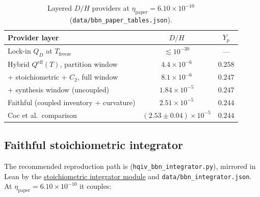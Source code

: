 \documentclass[11pt]{amsart}
\newcommand{\etap}{\ensuremath{\eta_{\mathrm{paper}}}}
\begin{document}
\begin{table}[ht]
\centering
\caption{Layered $D/H$ providers at $\etap=6.10\times10^{-10}$
(\texttt{data/bbn\_paper\_tables.json}).}
\label{tab:provider-decomposition}
\begin{tabular}{lcc}
\toprule
Provider layer & $D/H$ & $Y_p$ \\
\midrule
Lock-in $Q_D$ at $T_{\mathrm{freeze}}$ & $\lesssim 10^{-30}$ & --- \\
Hybrid $Q^{\mathrm{eff}}(T)$, partition window & $4.4\times 10^{-6}$ & $0.258$ \\
+ stoichiometric + $C_2$, full window & $8.1\times 10^{-6}$ & $0.247$ \\
+ synthesis window (uncoupled) & $1.84\times 10^{-5}$ & $0.247$ \\
Faithful (coupled inventory + curvature) & $2.51\times 10^{-5}$ & $0.244$ \\
\midrule
Coc et al.\ comparison \cite{coc2015} & $(2.53\pm0.04)\times10^{-5}$ & $0.244$ \\
\bottomrule
\end{tabular}
\end{table}

\subsection{Faithful stoichiometric integrator}
\label{sec:faithful-integrator}

{\sloppy
The recommended reproduction path is 
(\texttt{hqiv\_bbn\_integrator.py}), mirrored in Lean by the
\hyperref[lean:bbn-stoichiometric]{stoichiometric integrator module}
and \texttt{data/bbn\_integrator.json}.
At $\eta_{\mathrm{paper}}=6.10\times 10^{-10}$ it couples:
}
\end{document}

